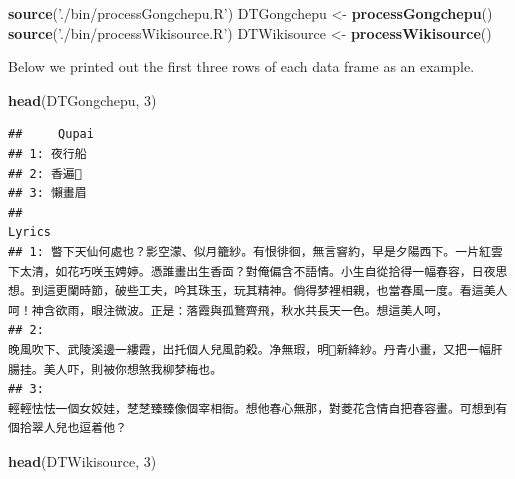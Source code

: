 \documentclass[]{article}
\newenvironment{Shaded}{\begin{snugshade}}{\end{snugshade}}
\newcommand{\DecValTok}[1]{\textcolor[rgb]{0.00,0.00,0.81}{#1}}
\newcommand{\KeywordTok}[1]{\textcolor[rgb]{0.13,0.29,0.53}{\textbf{#1}}}
\newcommand{\NormalTok}[1]{#1}
\newcommand{\StringTok}[1]{\textcolor[rgb]{0.31,0.60,0.02}{#1}}
\begin{document}
\begin{Shaded}
\begin{Highlighting}[]
\KeywordTok{source}\NormalTok{(}\StringTok{'./bin/processGongchepu.R'}\NormalTok{)}
\NormalTok{DTGongchepu <-}\StringTok{ }\KeywordTok{processGongchepu}\NormalTok{()}
\KeywordTok{source}\NormalTok{(}\StringTok{'./bin/processWikisource.R'}\NormalTok{)}
\NormalTok{DTWikisource <-}\StringTok{ }\KeywordTok{processWikisource}\NormalTok{()}
\end{Highlighting}
\end{Shaded}

Below we printed out the first three rows of each data frame as an
example.

\begin{Shaded}
\begin{Highlighting}[]
\KeywordTok{head}\NormalTok{(DTGongchepu, }\DecValTok{3}\NormalTok{)}
\end{Highlighting}
\end{Shaded}

\begin{verbatim}
##     Qupai
## 1: 夜行船
## 2: 香遍𣼛
## 3: 懶畫眉
##                                                                                                                                                                                                                                                                                                                            Lyrics
## 1: 瞥下天仙何處也？影空濛、似月籠紗。有恨徘徊，無言窨約，早是夕陽西下。一片紅雲下太清，如花巧咲玉娉婷。憑誰畫出生香靣？對俺偏含不語情。小生自從拾得一幅春容，日夜思想。到這更闌時節，破些工夫，吟其珠玉，玩其精神。倘得梦裡相親，也當春風一度。看這美人呵！神含欲雨，眼注微波。正是：落霞與孤鶩齊飛，秋水共長天一色。想這美人呵，
## 2:                                                                                                                                                                                                       晚風吹下、武陵溪邊一縷霞，出托個人兒風韵殺。净無瑕，明𥦗新絳紗。丹青小畫，又把一幅肝腸挂。美人吓，則被你想煞我柳梦梅也。
## 3:                                                                                                                                                                                                                       輕輕怯怯一個女姣娃，椘椘臻臻像個宰相衙。想他春心無那，對菱花含情自把春容畫。可想到有個拾翠人兒也逗着他？
\end{verbatim}

\begin{Shaded}
\begin{Highlighting}[]
\KeywordTok{head}\NormalTok{(DTWikisource, }\DecValTok{3}\NormalTok{)}
\end{Highlighting}
\end{Shaded}
\end{document}
